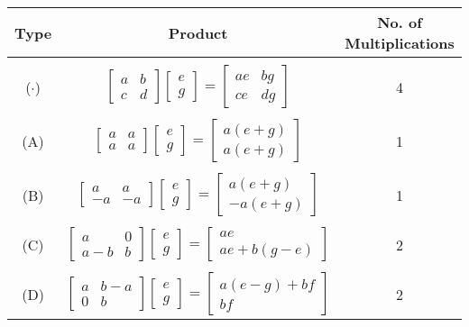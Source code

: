 \documentclass[11pt]{article}
\begin{document}
\begin{center}\begin{tabular}{c|c|c}Type & Product & No. of Multiplications\\
\hline
\\ ($\cdot$) & $\begin{bmatrix} a & b \\ c & d \end{bmatrix}\begin{bmatrix}e \\ g \end{bmatrix} = \begin{bmatrix} ae & bg \\ ce & dg \end{bmatrix}$ & 4 \\\\
(A) & $\begin{bmatrix} a & a \\ a & a \end{bmatrix}\begin{bmatrix}e \\ g \end{bmatrix} = \begin{bmatrix} a(e+g) \\ a(e+g) \end{bmatrix}$ & 1 \\\\ (B) & $\begin{bmatrix} a & a \\ -a & -a \end{bmatrix}\begin{bmatrix}e \\ g \end{bmatrix} = \begin{bmatrix} a(e+g) \\ -a(e+g) \end{bmatrix}$ & 1\\\\(C) & $\begin{bmatrix} a & 0 \\ a-b & b \end{bmatrix}\begin{bmatrix}e \\ g \end{bmatrix} = \begin{bmatrix} ae \\ ae+b(g-e) \end{bmatrix}$ & 2 \\\\(D) & $\begin{bmatrix} a & b-a \\ 0 & b \end{bmatrix}\begin{bmatrix}e \\ g \end{bmatrix} = \begin{bmatrix} a(e-g)+bf \\ bf \end{bmatrix}$ & 2\end{tabular}\end{center}
\end{document}
